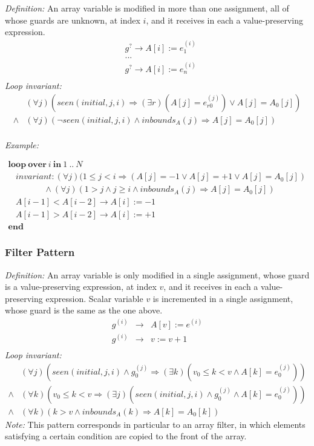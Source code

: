 \documentclass[a4paper,10pt]{article}
\newcommand{\idx}{\ensuremath{i}\xspace}
\newcommand{\idxinitial}{\ensuremath{\mathit{initial}}\xspace}
\newcommand{\KWloop}{\ensuremath{\mathrm{\textbf{loop}}~}}
\newcommand{\KWend}{\ensuremath{\mathrm{\textbf{end}}~}}
\newcommand{\KWover}{\ensuremath{\mathrm{\textbf{over}}~}}
\newcommand{\KWin}{\ensuremath{~\mathrm{\textbf{in}}~}}
\newcommand{\at}[1]{{(#1)}}
\newcommand{\impl}{\ensuremath{\Longrightarrow}}
\newcommand{\inbounds}[2]{\ensuremath{\mathit{inbounds}_{#1}(#2)}\xspace}
\newcommand{\seen}[3]{\ensuremath{\mathit{seen}{(#1,#2,#3)}}\xspace}
\newcommand{\loopinvariant}{\noindent\textit{Loop invariant:}\xspace}
\newcommand{\patterndef}{\noindent\textit{Definition:}\xspace}
\newcommand{\patternexample}{\noindent\textit{Example:}\xspace}
\newcommand{\patternnote}{\noindent\textit{Note:}\xspace}
\begin{document}
\patterndef An array variable is modified in more than one assignment, all
of whose guards are unknown, at index \idx, and it receives in each a
value-preserving expression.
%
\begin{eqnarray*}
&g^? \rightarrow A[\idx] := e_1^\at{\idx}\\
&...\\
&g^? \rightarrow A[\idx] := e_n^\at{\idx}\\
\end{eqnarray*}
%
\loopinvariant
%
\begin{eqnarray*}
&(\forall j)(\seen{\idxinitial}{j}{\idx} \impl (\exists r)(A[j] = e_{r0}^\at{j}) \lor A[j] = A_0[j]) \\
\land&
 (\forall j)(\neg \seen{\idxinitial}{j}{\idx} \land \inbounds{A}{j} \impl A[j] = A_0[j])\\
\end{eqnarray*}

\bigskip
\patternexample

\medskip
$\begin{array}{l}
  \KWloop \KWover i \KWin 1~..~N \\
  ~~~~ \textit{invariant}: (\forall j)(1 \leq j < i \impl (A[j] = -1 \lor A[j] = +1 \lor A[j] = A_0[j])\\
  ~~~~~~~~~~~~~~~~~~~ \land (\forall j)(1 > j \land j \geq i \land \inbounds{A}{j}\impl A[j] = A_0[j])\\
  ~~~~ A[i-1] < A[i-2] \rightarrow A[i] := -1\\
  ~~~~ A[i-1] > A[i-2] \rightarrow A[i] := +1\\
  \KWend
\end{array}$

\subsubsection*{Filter Pattern}

\patterndef An array variable is only modified in a single assignment, whose
guard is a value-preserving expression, at index $v$, and it receives in each a 
value-preserving expression. Scalar variable $v$ is incremented in a single assignment, 
whose guard is the same as the one above.
%
\begin{eqnarray*}
g^\at{\idx} &\rightarrow& A[v] := e^\at{\idx}\\
g^\at{\idx} &\rightarrow& v := v + 1\\
\end{eqnarray*}
%
\loopinvariant
%
\begin{eqnarray*}
&(\forall j)(\seen{\idxinitial}{j}{\idx} \land g_0^\at{j} \impl (\exists k)(v_0 \leq k < v \land A[k] = e_0^\at{j}))  \\
\land&
(\forall k)(v_0 \leq k < v \impl (\exists j)(\seen{\idxinitial}{j}{\idx} \land g_0^\at{j} \land A[k] = e_0^\at{j}))  \\
\land&
(\forall k)(k > v \land \inbounds{A}{k} \impl A[k] = A_0[k])
\end{eqnarray*}
%
\patternnote This pattern corresponds in particular to an array filter, in
which elements satisfying a certain condition are copied to the front of the
array.
\end{document}
